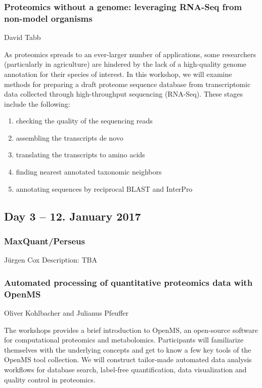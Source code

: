 \subsubsection*{\color{eubicRed} Proteomics without a genome: leveraging RNA-Seq from non-model organisms}
{\color{eubicGray} David Tabb}

As proteomics spreads to an ever-larger number of applications, some researchers
(particularly in agriculture) are hindered by the lack of a high-quality genome
annotation for their species of interest.  In this workshop, we will examine
methods for preparing a draft proteome sequence database from transcriptomic
data collected through high-throughput sequencing (RNA-Seq). These stages
include the following:
\begin{enumerate}
  \item checking the quality of the sequencing reads
  \item assembling the transcripts de novo
  \item translating the transcripts to amino acids
  \item finding nearest annotated taxonomic neighbors
  \item annotating sequences by reciprocal BLAST and InterPro
\end{enumerate}


\subsection*{Day 3 -- 12. January 2017}


\subsubsection*{\color{eubicRed} MaxQuant/Perseus}
{\color{eubicGray} Jürgen Cox}
Description: TBA


\subsubsection*{\color{eubicRed} Automated processing of quantitative proteomics data with OpenMS}
{\color{eubicGray} Oliver Kohlbacher and Julianus Pfeuffer}

The workshops provides a brief introduction to OpenMS, an open-source software
for computational proteomics and metabolomics. Participants will familiarize
themselves with the underlying concepts and get to know a few key tools of the
OpenMS tool collection. We will construct tailor-made automated data analysis
workflows for database search, label-free quantification, data visualization and
quality control in proteomics.

